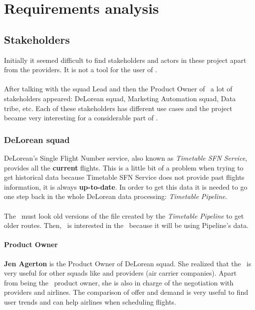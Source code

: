 
\chapter{Requirements analysis}

\label{chapter04}


\section{Stakeholders}

Initially it seemed difficult to find stakeholders and actors in these project apart from the providers. It is not a tool for the user of \company.
\\\\
After talking with the squad Lead and then the Product Owner of \squad\ a lot of stakeholders appeared: DeLorean squad, Marketing Automation squad, Data tribe, etc. Each of these stakeholders has different use cases and the project became very interesting for a considerable part of \company.

\subsection{DeLorean squad} \label{dlr}

DeLorean's Single Flight Number service, also known as \textit{Timetable SFN Service}, provides all the \textbf{current} flights. This is a little bit of a problem when trying to get historical data because Timetable SFN Service does not provide past flights information, it is always \textbf{up-to-date}. In order to get this data it is needed to go one step back in the whole DeLorean data processing: \textit{Timetable Pipeline}.
\\\\
The \thesis\ must look old versions of the file created by the \textit{Timetable Pipeline} to get older routes. Then, \squad\ is interested in the \thesis\ because it will be using Pipeline's data.

\subsubsection*{Product Owner} \label{product_owner}

\textbf{Jen Agerton} is the Product Owner of DeLorean squad. She realized that the \thesis\ is very useful for other squads like  and providers (air carrier companies). Apart from being the \squad\ product owner, she is also in charge of the negotiation with providers and airlines. The comparison of offer and demand is very useful to find user trends and can help airlines when scheduling flights.

